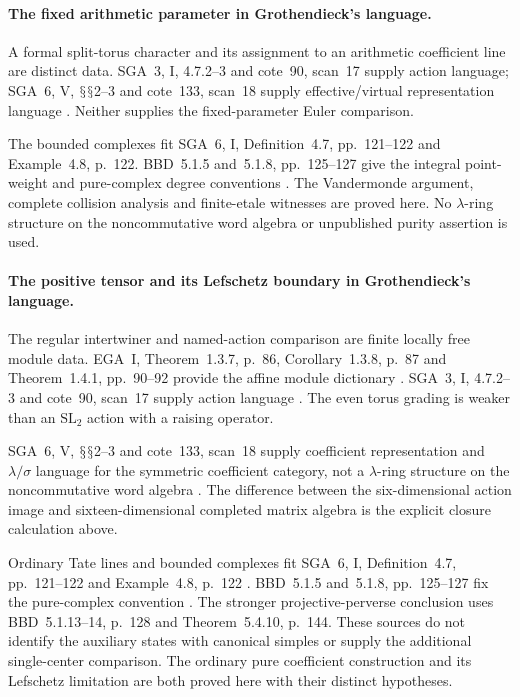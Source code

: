 \documentclass[11pt,a4paper]{article}
\renewcommand{\S}{\ensuremath{\mathsection}}
\theoremstyle{named}\newtheorem{finding}{Finding}[section]
\theoremstyle{definition}\newtheorem{definition}[finding]{Definition}
\theoremstyle{remark}\newtheorem{remark}[finding]{Remark}
\begin{document}
\paragraph{The fixed arithmetic parameter in Grothendieck's language.}
A formal split-torus character and its assignment to
an arithmetic coefficient line are distinct data.
SGA~3, I, 4.7.2--3 and cote~90, scan~17 supply
action language; SGA~6, V, \S\S2--3 and cote~133,
scan~18 supply effective/virtual representation
language \cite{SGA3,SGA6,Archive}.
Neither supplies the fixed-parameter Euler comparison.

The bounded complexes fit SGA~6, I, Definition~4.7,
pp.~121--122 and Example~4.8, p.~122.
BBD~5.1.5 and~5.1.8, pp.~125--127 give the integral
point-weight and pure-complex degree conventions
\cite{SGA6,BBD}.
The Vandermonde argument, complete collision analysis
and finite-etale witnesses are proved here.
No \(\lambda\)-ring structure on the noncommutative
word algebra or unpublished purity assertion is used.

\paragraph{The positive tensor and its Lefschetz boundary in Grothendieck's language.}
The regular intertwiner and named-action comparison
are finite locally free module data.
EGA~I, Theorem~1.3.7, p.~86, Corollary~1.3.8,
p.~87 and Theorem~1.4.1, pp.~90--92 provide
the affine module dictionary \cite{EGA}.
SGA~3, I, 4.7.2--3 and cote~90, scan~17 supply
action language \cite{SGA3,Archive}.
The even torus grading is weaker than an
\(\mathrm{SL}_2\) action with a raising operator.

SGA~6, V, \S\S2--3 and cote~133, scan~18
supply coefficient representation and
\(\lambda/\sigma\) language for the symmetric
coefficient category, not a \(\lambda\)-ring
structure on the noncommutative word algebra
\cite{SGA6,Archive}.
The difference between the six-dimensional action
image and sixteen-dimensional completed matrix
algebra is the explicit closure calculation above.

Ordinary Tate lines and bounded complexes fit
SGA~6, I, Definition~4.7, pp.~121--122 and
Example~4.8, p.~122 \cite{SGA6}.
BBD~5.1.5 and~5.1.8, pp.~125--127 fix the
pure-complex convention \cite{BBD}.
The stronger projective-perverse conclusion
uses BBD~5.1.13--14, p.~128 and
Theorem~5.4.10, p.~144.
These sources do not identify the auxiliary
states with canonical simples or supply the
additional single-center comparison.
The ordinary pure coefficient construction
and its Lefschetz limitation are both proved
here with their distinct hypotheses.
\end{document}
